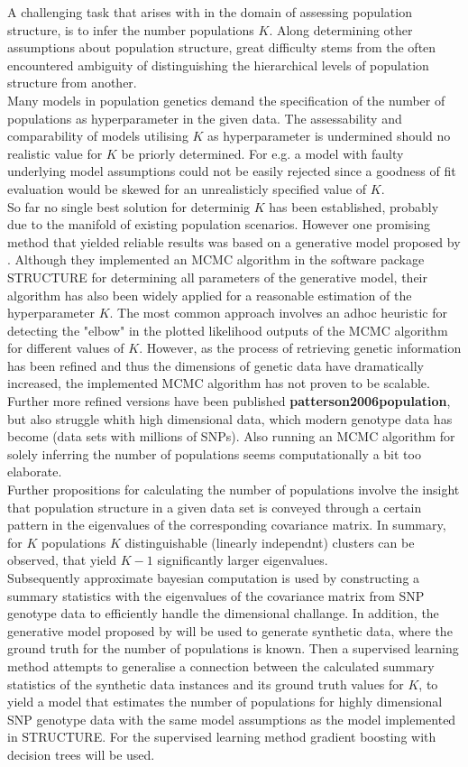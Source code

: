 \documentclass[a4paper, 11pt]{article}
\begin{document}
A challenging task that arises with in the domain of assessing population structure, is to infer the number populations $K$. Along determining other assumptions about population structure, great difficulty stems from the often encountered ambiguity of distinguishing the hierarchical levels of population structure from another.\\ Many models in population genetics demand the specification of the number of populations as hyperparameter in the given data. The assessability and comparability of models utilising $K$ as hyperparameter is undermined should no realistic value for $K$ be priorly determined. For e.g. a model with faulty underlying model assumptions could not be easily rejected since a goodness of fit evaluation would be skewed for an unrealisticly specified value of $K$.\\
So far no single best solution for determinig $K$ has been established, probably due to the manifold of existing population scenarios. However one promising method that yielded reliable results was based on a generative model proposed by \cite{pritchard2000inference, falush2003inference}. Although they implemented an MCMC algorithm in the software package STRUCTURE for determining all parameters of the generative model, their algorithm has also been widely applied for a reasonable estimation of the hyperparameter $K$. The most common approach involves an adhoc heuristic for detecting the "elbow" in the plotted  likelihood outputs of the MCMC algorithm for different values of $K$. However, as the process of retrieving genetic information has been refined and thus the dimensions of genetic data have dramatically increased, the implemented MCMC algorithm has not proven to be scalable. Further more refined versions have been published \textbf{patterson2006population}, but also struggle whith high dimensional data, which modern genotype data has become (data sets with millions of SNPs). Also running an MCMC algorithm for solely inferring the number of populations seems computationally a bit too elaborate.\\
Further propositions for calculating the number of populations involve the insight that population structure in a given data set is conveyed through a certain pattern in the eigenvalues of the corresponding covariance matrix. In summary, for $K$ populations $K$ distinguishable (linearly independnt) clusters can be observed, that yield $K-1$ significantly larger eigenvalues.\\
Subsequently approximate bayesian computation is used by constructing a summary statistics with the eigenvalues of the covariance matrix from SNP genotype data to efficiently handle the dimensional challange. In addition, the generative model proposed by \cite{pritchard2000inference, falush2003inference} will be used to generate synthetic data, where the ground truth for the number of populations is known. Then a supervised learning method attempts to generalise a connection between the calculated summary statistics of the synthetic data instances and its ground truth values for $K$, to yield a model that estimates the number of populations for highly dimensional SNP genotype data with the same model assumptions as the model implemented in STRUCTURE. For the supervised learning method gradient boosting with decision trees will be used.
\end{document}
